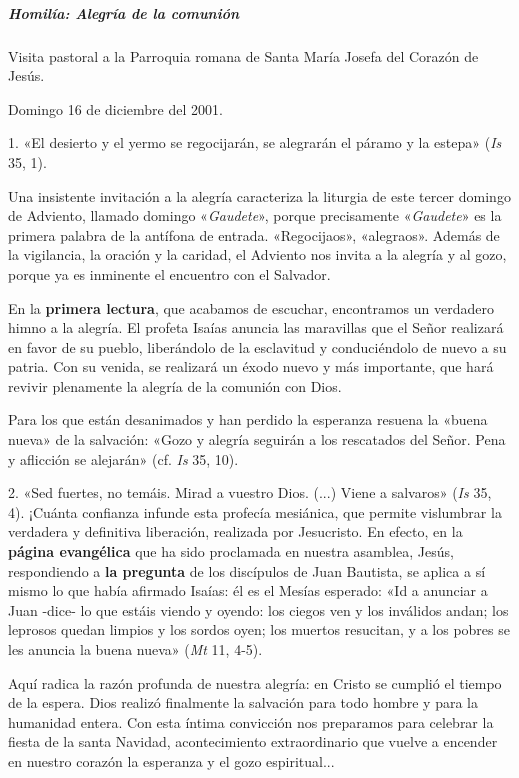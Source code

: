 \documentclass[]{article}
\let\oldsubparagraph\subparagraph
\renewcommand{\subparagraph}[1]{\oldsubparagraph{#1}\mbox{}}
\begin{document}
\subparagraph{Homilía: Alegría de la
comunión}\label{homiluxeda-alegruxeda-de-la-comuniuxf3n}

Visita pastoral a la Parroquia romana de Santa María Josefa del Corazón
de Jesús.

Domingo 16 de diciembre del 2001.

1. «El desierto y el yermo se regocijarán, se alegrarán el páramo y la
estepa» (\emph{Is} 35, 1).

Una insistente invitación a la alegría caracteriza la liturgia de este
tercer domingo de Adviento, llamado domingo «\emph{Gaudete}», porque
precisamente «\emph{Gaudete}» es la primera palabra de la antífona de
entrada. «Regocijaos», «alegraos». Además de la vigilancia, la oración y
la caridad, el Adviento nos invita a la alegría y al gozo, porque ya es
inminente el encuentro con el Salvador.

En la \textbf{primera lectura}, que acabamos de escuchar, encontramos un
verdadero himno a la alegría. El profeta Isaías anuncia las maravillas
que el Señor realizará en favor de su pueblo, liberándolo de la
esclavitud y conduciéndolo de nuevo a su patria. Con su venida, se
realizará un éxodo nuevo y más importante, que hará revivir plenamente
la alegría de la comunión con Dios.

Para los que están desanimados y han perdido la esperanza resuena la
«buena nueva» de la salvación: «Gozo y alegría seguirán a los rescatados
del Señor. Pena y aflicción se alejarán» (cf. \emph{Is} 35, 10).

2. «Sed fuertes, no temáis. Mirad a vuestro Dios. (...) Viene a
salvaros» (\emph{Is} 35, 4). ¡Cuánta confianza infunde esta profecía
mesiánica, que permite vislumbrar la verdadera y definitiva liberación,
realizada por Jesucristo. En efecto, en la \textbf{página evangélica}
que ha sido proclamada en nuestra asamblea, Jesús, respondiendo a
\textbf{la pregunta} de los discípulos de Juan Bautista, se aplica a sí
mismo lo que había afirmado Isaías: él es el Mesías esperado: «Id a
anunciar a Juan -dice- lo que estáis viendo y oyendo: los ciegos ven y
los inválidos andan; los leprosos quedan limpios y los sordos oyen; los
muertos resucitan, y a los pobres se les anuncia la buena nueva»
(\emph{Mt} 11, 4-5).

Aquí radica la razón profunda de nuestra alegría: en Cristo se cumplió
el tiempo de la espera. Dios realizó finalmente la salvación para todo
hombre y para la humanidad entera. Con esta íntima convicción nos
preparamos para celebrar la fiesta de la santa Navidad, acontecimiento
extraordinario que vuelve a encender en nuestro corazón la esperanza y
el gozo espiritual...
\end{document}
